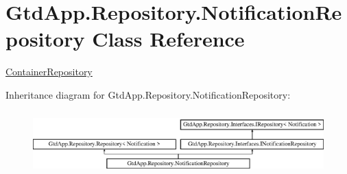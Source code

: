 \hypertarget{class_gtd_app_1_1_repository_1_1_notification_repository}{}\section{Gtd\+App.\+Repository.\+Notification\+Repository Class Reference}
\label{class_gtd_app_1_1_repository_1_1_notification_repository}


\mbox{\hyperlink{class_gtd_app_1_1_repository_1_1_container_repository}{Container\+Repository}}  


Inheritance diagram for Gtd\+App.\+Repository.\+Notification\+Repository\+:\begin{figure}[H]
\begin{center}
\leavevmode
\includegraphics[height=2.470588cm]{class_gtd_app_1_1_repository_1_1_notification_repository}
\end{center}
\end{figure}
